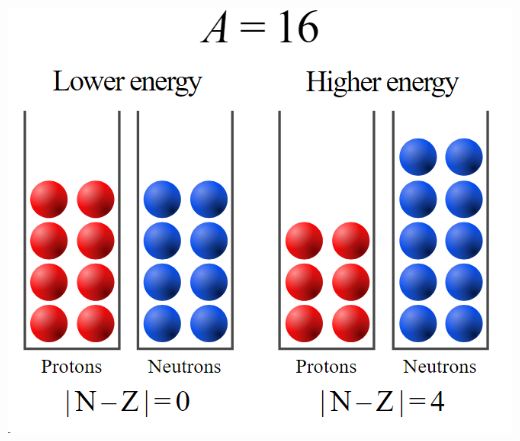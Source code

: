 \documentclass{homework}
\begin{document}
\begin{enumerate}
\begin{enumerate}
			\begin{center}
				\includegraphics[width=0.7\linewidth]{screenshot001}
			\end{center}
			
			
		\end{enumerate}
	\end{enumerate}
\end{document}
